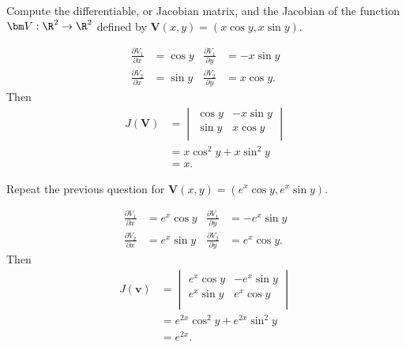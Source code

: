 \question Compute the differentiable, or Jacobian matrix, and the
Jacobian of the function $\bm V: \R^2 \to \R^2$
defined by $\bm V(x, y) = (x\cos y, x\sin y)$.
\begin{solution}
    \begin{align*}
        \frac{\partial V_1}{\partial x} &= \cos y
        & \frac{\partial V_1}{\partial y} &= -x\sin y \\
        \frac{\partial V_2}{\partial x} &= \sin y
        & \frac{\partial V_2}{\partial y} &= x\cos y.
    \end{align*}
    Then
    \begin{align*}
        J(\bm V)
        &=
        \begin{vmatrix}
            \cos y & -x\sin y \\
            \sin y & x\cos y \\
        \end{vmatrix}
        \\
        &= x\cos^2y + x\sin^2y \\
        &= x.
    \end{align*}
\end{solution}

\question Repeat the previous question for 
$\bm V(x, y) = (e^x \cos y, e^x \sin y)$.
\begin{solution}
    \begin{align*}
        \frac{\partial V_1}{\partial x} &= e^x \cos y
        & \frac{\partial V_1}{\partial y} &= -e^x \sin y \\
        \frac{\partial V_2}{\partial x} &= e^x \sin y
        & \frac{\partial V_2}{\partial y} &= e^x \cos y.
    \end{align*}
    Then
    \begin{align*}
        J(\bm v)
        &=
        \begin{vmatrix}
            e^x \cos y & -e^x \sin y \\
            e^x \sin y & e^x \cos y \\
        \end{vmatrix}
        \\
        &= e^{2x} \cos^2y + e^{2x} \sin^2y \\
        &= e^{2x}.
    \end{align*}
\end{solution}

